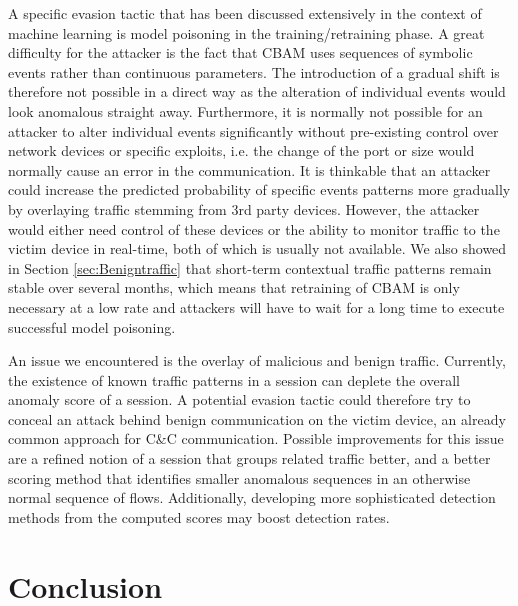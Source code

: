 A specific evasion tactic that has been discussed extensively in the context of machine learning is model poisoning in the training/retraining phase. A great difficulty for the attacker is the fact that CBAM uses sequences of symbolic events rather than continuous parameters. The introduction of a gradual shift is therefore not possible in a direct way as the alteration of individual events would look anomalous straight away. Furthermore, it is normally not possible for an attacker to alter individual events significantly without pre-existing control over network devices or specific exploits, i.e. the change of the port or size would normally cause an error in the communication. It is thinkable that an attacker could increase the predicted probability of specific events patterns more gradually by overlaying traffic stemming from 3rd party devices. However, the attacker would either need control of these devices or the ability to monitor traffic to the victim device in real-time, both of which is usually not available.
We also showed in Section \ref{sec:Benigntraffic} that short-term contextual traffic patterns remain stable over several months, which means that retraining of CBAM is only necessary at a low rate and attackers will have to wait for a long time to execute successful model poisoning.




An issue we encountered is the overlay of malicious and benign traffic. Currently, the existence of known traffic patterns in a session can deplete the overall anomaly score of a session. A potential evasion tactic could therefore try to conceal an attack behind benign communication on the victim device, an already common approach for C\&C communication. Possible improvements for this issue are a refined notion of a session that groups related traffic better, and a better scoring method that identifies smaller anomalous sequences in an otherwise normal sequence of flows. Additionally, developing more sophisticated detection methods from the computed scores may boost detection rates.



\section{Conclusion}\label{Sec:flaws}


